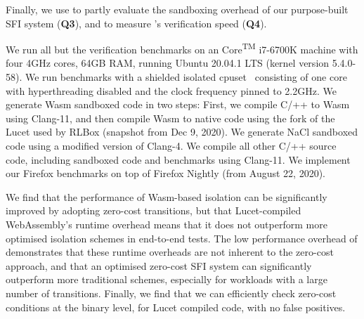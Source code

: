 Finally, we use \SPECOhSix to partly evaluate the sandboxing overhead of our
purpose-built \trsegmentsfi SFI system (\textbf{Q3}), and to measure
\verifname's verification speed (\textbf{Q4}).

%
We run all but the verification benchmarks on an \Intel
Core\textsuperscript{TM} i7-6700K machine with four 4GHz cores, 64GB RAM,
running Ubuntu 20.04.1 LTS (kernel version 5.4.0-58).
%
We run benchmarks with a shielded isolated cpuset~\cite{cpu-shielding}
consisting of one core with hyperthreading disabled and the clock frequency
pinned to 2.2GHz.
%
We generate Wasm sandboxed code in two steps: First, we compile C/\C++
to Wasm using Clang-11, and then compile Wasm to native code using the 
fork of the Lucet used by RLBox (snapshot from Dec 9, 2020).
%
We generate NaCl sandboxed code using a modified version of Clang-4.
%
We compile all other C/\C++ source code, including \trsegmentsfi sandboxed code and
benchmarks using Clang-11.
%
We implement our Firefox benchmarks on top of Firefox Nightly (from August 22,
2020).

%
We find that the performance of Wasm-based isolation
can be significantly improved by adopting zero-cost transitions, but that
Lucet-compiled WebAssembly's runtime overhead means that it does not outperform
more optimised isolation schemes in end-to-end tests.
%
The low performance overhead of \trsegmentsfi demonstrates that these runtime
overheads are not inherent to the zero-cost approach, and that an optimised
zero-cost SFI system can significantly outperform more traditional schemes,
especially for workloads with a large number of transitions.
%
Finally, we find that we can efficiently check zero-cost conditions at the
binary level, for Lucet compiled code, with no false positives.






